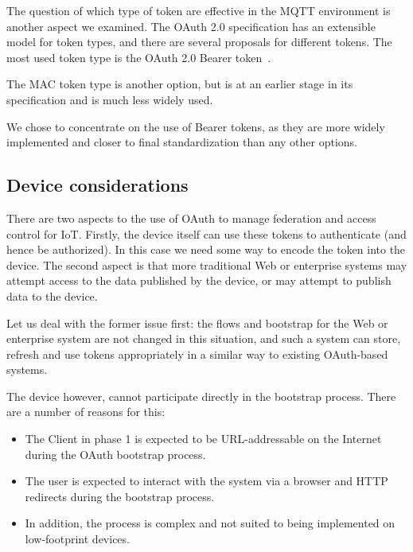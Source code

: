 \documentclass{llncs}
\begin{document}
The question of which type of token are effective in the MQTT environment is another aspect we 
examined. The OAuth 2.0 specification has an extensible model for token types, and there are several
proposals for different tokens. The most used token type is the OAuth 2.0 Bearer token~\cite{oauth2-bearer}.

The MAC token type is another option, but is at an earlier stage in its specification and is much
less widely used. 

We chose to concentrate on the use of Bearer tokens, as they are more widely implemented and 
closer to final standardization than any other options.

\subsection{Device considerations}
There are two aspects to the use of OAuth to manage federation and access control for IoT.
Firstly, the device itself can use these tokens to authenticate (and hence be authorized). In 
this case we need some way to encode the token into the device. The second aspect is that more
traditional Web or enterprise systems may attempt access to the data published by the device, 
or may attempt to publish data to the device.

Let us deal with the former issue first: the flows and bootstrap for the Web or enterprise system
are not changed in this situation, and such a system can store, refresh and use tokens appropriately
in a similar way to existing OAuth-based systems. 

The device however, cannot participate directly in the bootstrap process. There are a number 
of reasons for this:
\begin{itemize} 
\item The Client in phase 1 is expected to be URL-addressable on the Internet during the OAuth 
bootstrap process.
\item The user is expected to interact with the system via a browser and HTTP redirects during 
the bootstrap process.
\item In addition, the process is complex and not suited to being implemented on low-footprint devices.
\end{itemize}
\end{document}
